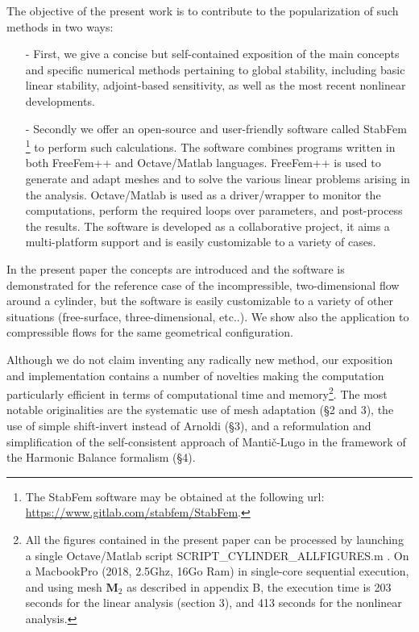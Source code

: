 \documentclass[twocolumn,10pt]{asme2ej}
\begin{document}
The objective of the present work is to contribute to the popularization of such methods 
in two ways:
\begin{itemize}
\item[-]
First, we give a concise but self-contained exposition of the main concepts and 
specific numerical methods pertaining to global stability, including basic linear stability, adjoint-based sensitivity, as well as the most recent nonlinear developments.
\item[-]
Secondly we offer an open-source and user-friendly software called  {\sf StabFem} %
\footnote{The StabFem software may be obtained at the following url: \\
\url{https://www.gitlab.com/stabfem/StabFem}. 
} 
to perform such calculations. The software combines programs written in both FreeFem++ \cite{MR3043640} and Octave/Matlab languages. 
FreeFem++ is used to generate and adapt meshes and to solve the various linear problems arising in the analysis. Octave/Matlab is used as a driver/wrapper to monitor the computations, perform the required loops over parameters, and post-process the results. The software is developed as a collaborative project, it aims a multi-platform support and is easily customizable to a variety of cases. 
\end{itemize}

In the present paper the concepts are introduced and the software is demonstrated for the reference case of the incompressible, two-dimensional flow around a cylinder, but the software is easily customizable to a variety of other situations (free-surface, three-dimensional, etc..). We show also the application to compressible flows for the same geometrical configuration.

Although we do not claim inventing any radically new method, our exposition and implementation contains a number of novelties making the computation particularly efficient in terms of computational time and memory\footnote{All the figures contained in the present paper can be processed by launching a single Octave/Matlab script {\sf SCRIPT\_CYLINDER\_ALLFIGURES.m} . On a MacbookPro (2018,  2.5Ghz, 16Go Ram) in single-core sequential execution,  and using mesh ${\mathbf M}_2$ as described in appendix B, the execution time is 203 seconds for the linear analysis (section 3), and 413 seconds for the nonlinear analysis.}.
The most notable originalities are the systematic use of mesh adaptation (\S 2 and 3), the use of simple shift-invert instead of Arnoldi (\S 3), and a reformulation and simplification of the self-consistent approach of Manti\v{c}-Lugo in the framework of the Harmonic Balance formalism   (\S 4).
 
\end{document}
